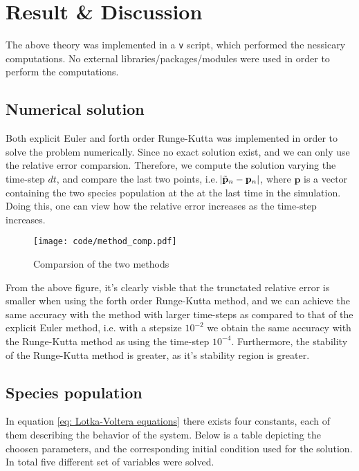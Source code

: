 \documentclass[a4paper]{article}
\begin{document}
\newpage
\section{Result \& Discussion}
The above theory was implemented in a \verb|v| script, which performed the nessicary computations. No external libraries/packages/modules were used in order to perform the computations.

\subsection{Numerical solution}
Both explicit Euler and forth order Runge-Kutta was implemented in order to solve the problem numerically. Since no exact solution exist, and we can only use the relative error comparsion. Therefore, we compute the solution varying the time-step $dt$, and compare the last two points, i.e. $\abs{\tilde{\mathbf{p}}_{n}- \mathbf{p}_n}$, where $\mathbf{p}$ is a vector containing the two species population at the at the last time in the simulation. Doing this, one can view how the relative error increases as the time-step increases.
\begin{minipage}{0.5\textwidth}
\begin{figure}[H]
    \centering
    \texttt{[image: code/method\_comp.pdf]}
    \caption{Comparsion of the two methods}
    \label{fig: method comparison}
\end{figure}
\end{minipage}
\begin{minipage}{0.5\textwidth}
From the above figure, it's clearly visble that the trunctated relative error is smaller when using the forth order Runge-Kutta method, and we can achieve the same accuracy with the method with larger time-steps as compared to that of the explicit Euler method, i.e. with a stepsize $10^{-2}$ we obtain the same accuracy with the Runge-Kutta method as using the time-step $10^{-4}$. Furthermore, the stability of the Runge-Kutta method is greater, as it's stability region is greater.
\end{minipage}

\subsection{Species population}
In equation \eqref{eq: Lotka-Voltera equations} there exists four constants, each of them describing the behavior of the system. Below is a table depicting the choosen parameters, and the corresponding initial condition used for the solution. In total five different set of variables were solved.
\end{document}
